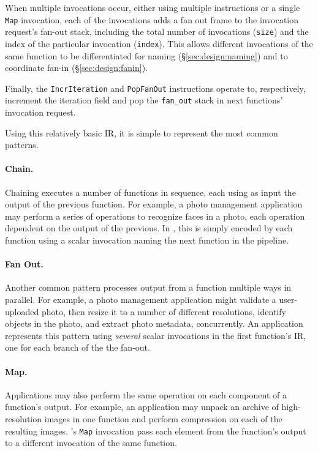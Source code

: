 When multiple invocations occur, either using multiple instructions or a single
\texttt{Map} invocation, each of the invocations adds a fan out frame to the
invocation request's fan-out stack, including the total number of invocations
(\texttt{size}) and the index of the particular invocation (\texttt{index}).
This allows different invocations of the same function to be differentiated for
naming (\S\ref{sec:design:naming}) and to coordinate fan-in
(\S\ref{sec:design:fanin}).

Finally, the \texttt{IncrIteration} and \texttt{PopFanOut} instructions operate
to, respectively, increment the iteration field and pop the \texttt{fan\_out}
stack in next functions' invocation request.

Using this relatively basic IR, it is simple to represent the most common patterns.

\paragraph{Chain.}
Chaining executes a number of functions in sequence, each using as input the
output of the previous function. For example, a photo management application may
perform a series of operations to recognize faces in a photo, each operation
dependent on the output of the previous. In \name{}, this is simply encoded by
each function using a scalar invocation naming the next function in the
pipeline.

\paragraph{Fan Out.}
Another common pattern processes output from a function multiple ways in
parallel. For example, a photo management application might validate a
user-uploaded photo, then resize it to a number of different resolutions,
identify objects in the photo, and extract photo metadata, concurrently. An
\name{} application represents this pattern using \emph{several} scalar
invocations in the first function's IR, one for each branch of the the fan-out.

\paragraph{Map.}
Applications may also perform the same operation on each component of a
function's output. For example, an application may unpack an archive of
high-resolution images in one function and perform compression on each of the
resulting images. \name{}'s \texttt{Map} invocation pass each element from the
function's output to a different invocation of the same function.

